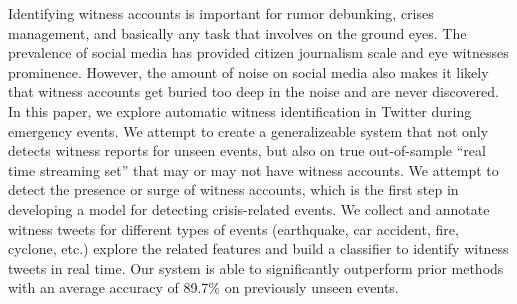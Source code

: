 Identifying witness accounts is important for rumor debunking, crises management, and basically any task that involves on the ground eyes. The prevalence of social media has provided citizen journalism scale and eye witnesses prominence.  However, the amount of noise on social media also makes it likely that witness accounts get buried too deep in the noise and are never discovered. In this paper, we explore automatic witness identification in Twitter during emergency events. We attempt to create a generalizeable system that not only detects witness reports for unseen events, but also on true out-of-sample ``real time streaming set'' that may or may not have witness accounts. We attempt to detect the presence or surge of witness accounts, which is the first step in developing a model for detecting crisis-related events. We collect and annotate witness tweets for different types of events (earthquake, car accident, fire, cyclone, etc.) explore the related features and build a classifier to identify witness tweets in real time. Our system is able to significantly outperform prior methods with an average accuracy of 89.7\% on previously unseen events.
